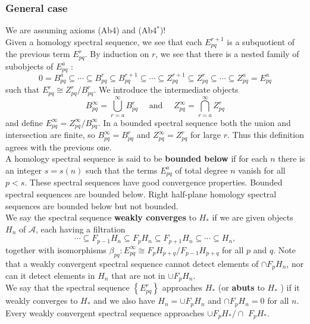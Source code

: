 \begin{example}
\subsubsection{General case}

We are assuming axioms (Ab4) and (Ab4$^*$)!\\

Given a homology spectral sequence, we see that each $E_{p q}^{r+1}$ is a subquotient of the previous term $E_{p q}^r$. By induction on $r$, we see that there is a nested family of subobjects of $E_{p q}^a$ :
$$
0=B_{p q}^a \subseteq \cdots \subseteq B_{p q}^r \subseteq B_{p q}^{r+1} \subseteq \cdots \subseteq Z_{p q}^{r+1} \subseteq Z_{p q}^r \subseteq \cdots \subseteq Z_{p q}^a=E_{p q}^a
$$
such that $E_{p q}^r \cong Z_{p q}^r / B_{p q}^r$. We introduce the intermediate objects
$$
B_{p q}^{\infty}=\bigcup_{r=a}^{\infty} B_{p q}^r \quad \text { and } \quad Z_{p q}^{\infty}=\bigcap_{r=a}^{\infty} Z_{p q}^r
$$
and define $E_{p q}^{\infty}=Z_{p q}^{\infty} / B_{p q}^{\infty}$. In a bounded spectral sequence both the union and intersection are finite, so $B_{p q}^{\infty}=B_{p q}^r$ and $Z_{p q}^{\infty}=Z_{p q}^r$ for large $r$. Thus this definition agrees with the previous one.\\
A homology spectral sequence is said to be \textbf{bounded below }if for each $n$ there is an integer $s=s(n)$ such that the terms $E_{p q}^a$ of total degree $n$ vanish for all $p<s$. These spectral sequences have good convergence properties. Bounded spectral sequences are bounded below. Right half-plane homology spectral sequences are bounded below but not bounded.\\

We say the spectral sequence \textbf{weakly converges} to $H_*$ if we are given objects $H_n$ of $\mathcal{A}$, each having a filtration
$$
\cdots \subseteq F_{p-1} H_n \subseteq F_p H_n \subseteq F_{p+1} H_n \subseteq \cdots \subseteq H_n,
$$
together with isomorphisms $\beta_{p q}: E_{p q}^{\infty} \cong F_p H_{p+q} / F_{p-1} H_{p+q}$ for all $p$ and $q$. Note that a weakly convergent spectral sequence cannot detect elements of $\cap F_p H_n$, nor can it detect elements in $H_n$ that are not in $\cup F_p H_n$.\\
We say that the spectral sequence $\left\{E_{p q}^r\right\}$ approaches $H_*$ (or \textbf{abuts} to $H_*$ ) if it weakly converges to $H_*$ and we also have $H_n=\cup F_p H_n$ and $\cap F_p H_n=0$ for all $n$. Every weakly convergent spectral sequence approaches $\cup F_p H_* / \cap$ $F_p H_*$.\\


\end{example}
